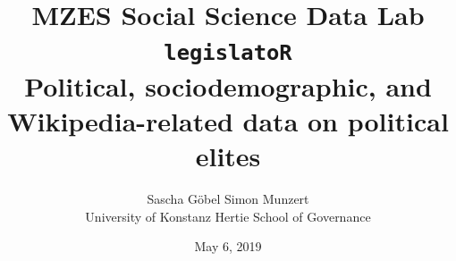 
\usepackage{fontawesome}
\usepackage{enumitem}
\usepackage{subfig}

\newenvironment{myblock}[3]{%
  \setbeamercolor{block body}{#2}
  \setbeamercolor{block title}{#3}
  \begin{block}{#1}}{\end{block}}
  
\newcommand{\emojiNo}{%
  \begingroup\normalfont
  \texttt{[image: ../figures/1F62B.pdf]}%
  \endgroup
}

\newcommand{\emojiYes}{%
  \begingroup\normalfont
  \texttt{[image: ../figures/1F603.pdf]}%
  \endgroup
}


\usepackage{tikz}
\newcommand*\circled[1]{\tikz[baseline=(char.base)]{
            \node[shape=circle,draw,inner sep=2pt] (char) {#1};}}

            
\title[The legislatoR package]{{\small MZES Social Science Data Lab \vspace{.5cm}\\ \huge \textbf{\texttt{legislatoR}} \vspace{.25cm} \\ \textbf{Political, sociodemographic, and Wikipedia-related data on political elites}}} 
\author[G\"obel and Munzert]{Sascha G\"obel \hfill Simon Munzert  \\ University of Konstanz \hfill Hertie School of Governance} 
\institute[\textsc{\textcolor{white}{G\"obel and Munzert}}]{}
\date{\vspace{.5cm}\small May 6, 2019} 


\makeindex


\thispagestyle{empty}
\frame{\titlepage} 


